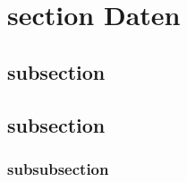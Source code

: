 \section{section Daten}
\lipsum[1]
\subsection{subsection}
\lipsum[2]
\subsection{subsection}
\lipsum[2]
\subsubsection{subsubsection}
\lipsum[3-4]